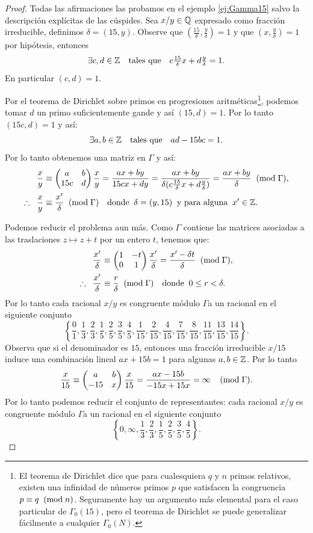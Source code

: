 \documentclass[../../tesis_maestria]{subfiles}
\begin{document}
\begin{proof}
  Todas las afirmaciones las probamos en el ejemplo \ref{ej:Gamma15} salvo la descripci\'on
  expl\'icitas de las c\'uspides. Sea $x/y\in\mathbb{Q}$ expresado como fracci\'on irreducible, definimos
  $\delta=(15,y)$. Observe que $(\tfrac{15}{\delta},\tfrac{y}{\delta})=1$ y que
  $(x,\tfrac{y}{\delta})=1$ por hip\'otesis, entonces
  \[
    \exists c,d\in\mathbb{Z} \quad\text{tales que}\quad c\tfrac{15}{\delta}x+d\tfrac{y}{\delta}=1.
  \]
  En particular $(c,d)=1$.
  
  Por el teorema de Dirichlet sobre primos en progresiones aritm\'eticas\footnote{El
    teorema de Dirichlet dice que para cualesquiera
    $q$ y $n$ primos relativos, existen una infinidad de n\'umeros primos $p$ que satisfacen la
    congruencia $p\equiv q\;\;(\mathrm{mod}\; n)$. Seguramente hay un argumento m\'as elemental para el caso particular
    de $\Gamma_0(15)$, pero el teorema de Dirichlet se puede generalizar f\'acilmente a cualquier
    $\Gamma_0(N)$.},
  podemos tomar $d$ un primo suficientemente gande y as\'i $(15,d)=1$. Por lo tanto $(15c,d)=1$
  y as\'i:
  \[
    \exists a,b\in\mathbb{Z} \quad\text{tales que}\quad ad-15bc=1.
  \]
  Por lo tanto obtenemos una matriz en $\Gamma$ y as\'i:
  \begin{align*}
    \frac{x}{y}
    &\equiv \begin{pmatrix}a & b\\ 15c & d\end{pmatrix}\frac{x}{y}=\frac{ax+by}{15cx+dy}
      =\frac{ax+by}{\delta(c\tfrac{15}{\delta}x+d\tfrac{y}{\delta})}
      =\frac{ax+by}{\delta}\;\;(\mathrm{mod}\; \Gamma),\\
    \therefore\;\;\frac{x}{y}
    &\equiv\frac{x'}{\delta}\;\;(\mathrm{mod}\; \Gamma)
      \quad\text{donde}\;\;\delta=(y,15)\;\;\text{y para alguna}\;\; x'\in\mathbb{Z}.   
  \end{align*}

  Podemos reducir el problema aun m\'as. Como $\Gamma$ contiene las matrices asociadas a las
  traslaciones $z\mapsto z+t$ por un entero $t$, tenemos que:  
  \begin{align*}
    \frac{x'}{\delta}
    &\equiv\begin{pmatrix}1 & -t\\ 0 & 1\end{pmatrix}\frac{x'}{\delta}=\frac{x'-\delta t}{\delta}\;\;(\mathrm{mod}\; \Gamma),\\
    \therefore\;\;\frac{x'}{\delta}
    &\equiv\frac{r}{\delta}\;\;(\mathrm{mod}\; \Gamma)
      \quad\text{donde}\;\; 0\leq r<\delta.  
  \end{align*}
  Por lo tanto cada racional $x/y$ es congruente m\'odulo $\Gamma $a un racional en el
  siguiente conjunto
  \[
    \left\{\frac{0}{1},\frac{1}{3},\frac{2}{3},\frac{1}{5},\frac{2}{5},\frac{3}{5},\frac{4}{5},
      \frac{1}{15},\frac{2}{15},\frac{4}{15},\frac{7}{15},\frac{8}{15},\frac{11}{15},\frac{13}{15},
      \frac{14}{15}\right\}.
  \]
  Observa que si el denominador es $15$, entonces una fracci\'on irreducible $x/15$ induce una
  combinaci\'on lineal $ax+15b=1$ para algunas $a,b\in\mathbb{Z}$. Por lo tanto
  \[
    \frac{x}{15}\equiv \begin{pmatrix}a & b\\ -15 & x\end{pmatrix}\frac{x}{15}=\frac{ax-15b}{-15x+15x}=\infty \;\;\;\;(\mathrm{mod}\; \Gamma).
  \]
  Por lo tanto podemos reducir el conjunto de representantes: cada racional $x/y$ es congruente
  m\'odulo $\Gamma $a un racional en el siguiente conjunto
  \[
    \left\{0,\infty,\frac{1}{3},\frac{2}{3},\frac{1}{5},\frac{2}{5},\frac{3}{5},\frac{4}{5}\right\}.
  \]


\end{proof}
\end{document}
